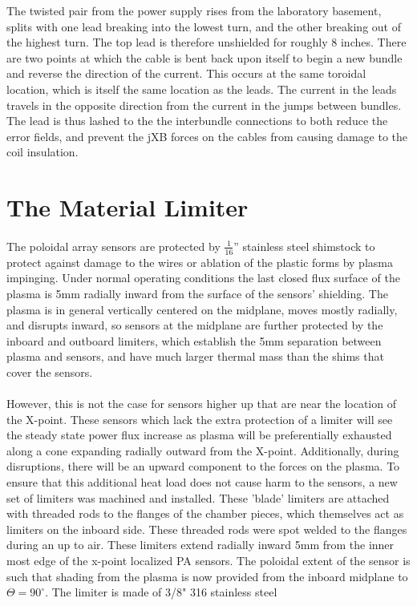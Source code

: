 The twisted pair from the power supply rises from the laboratory basement, splits with one lead breaking into the lowest turn, and the other breaking out of the highest turn.  The top lead is therefore unshielded for roughly 8 inches.  There are two points at which the cable is bent back upon itself to begin a new bundle and reverse the direction of the current.  This occurs at the same toroidal location, which is itself the same location as the leads.  The current in the leads travels in the opposite direction from the current in the jumps between bundles.  The lead is thus lashed to the the interbundle connections to both reduce the error fields, and prevent the jXB forces on the cables from causing damage to the coil insulation.
\section{The Material Limiter}
\paragraph{}The poloidal array sensors are protected by $\frac{1}{16}$'' stainless steel shimstock to protect against damage to the wires or ablation of the plastic forms by plasma impinging.  Under normal operating conditions the last closed flux surface of the plasma is 5mm radially inward from the surface of the sensors' shielding.  The plasma is in general vertically centered on the midplane, moves mostly radially, and disrupts inward, so sensors at the midplane are further protected by the inboard and outboard limiters, which establish the 5mm separation between plasma and sensors, and have much larger thermal mass than the shims that cover the sensors.
\paragraph{}However, this is not the case for sensors higher up that are near the location of the X-point.  These sensors which lack the extra protection of a limiter will see the steady state power flux increase as plasma will be preferentially exhausted along a cone expanding radially outward from the X-point.  Additionally, during disruptions, there will be an upward component to the forces on the plasma.  To ensure that this additional heat load does not cause harm to the sensors, a new set of limiters was machined and installed.  These 'blade' limiters are attached with threaded rods to the flanges of the chamber pieces, which themselves act as limiters on the inboard side.  These threaded rods were spot welded to the flanges during an up to air.  These limiters extend radially inward 5mm from the inner most edge of the x-point localized PA sensors.  The poloidal extent of the sensor is such that shading from the plasma is now provided from the inboard midplane to $\Theta = 90^{\circ}$.  The limiter is made of 3/8" 316 stainless steel
